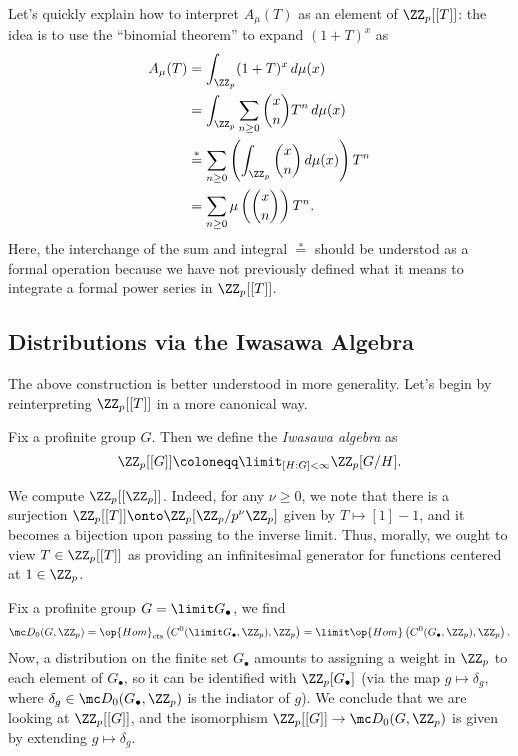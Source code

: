 \documentclass{article}
\begin{document}
Let's quickly explain how to interpret $A_\mu(T)$ as an element of $\ZZ_p[[T]]$: the idea is to use the ``binomial theorem'' to expand $(1+T)^x$ as
\begin{align*}
	A_\mu(T) &= \int_{\ZZ_p}(1+T)^x\,d\mu(x) \\
	&= \int_{\ZZ_p}\sum_{n\ge0}\binom xnT^n\,d\mu(x) \\
	&\stackrel*= \sum_{n\ge0}\left(\int_{\ZZ_p}\binom xn\,d\mu(x)\right)T^n \\
	&= \sum_{n\ge0}\mu\left(\binom xn\right)T^n.
\end{align*}
Here, the interchange of the sum and integral $\stackrel*=$ should be understod as a formal operation because we have not previously defined what it means to integrate a formal power series in $\ZZ_p[[T]]$.

\subsection{Distributions via the Iwasawa Algebra}
The above construction is better understood in more generality. Let's begin by reinterpreting $\ZZ_p[[T]]$ in a more canonical way.
\begin{definition}
	Fix a profinite group $G$. Then we define the \textit{Iwasawa algebra} as
	\[\ZZ_p[[G]]\coloneqq\limit_{[H:G]<\infty}\ZZ_p[G/H].\]
\end{definition}
\begin{example}
	We compute $\ZZ_p[[\ZZ_p]]$. Indeed, for any $\nu\ge0$, we note that there is a surjection $\ZZ_p[[T]]\onto\ZZ_p[\ZZ_p/p^\nu\ZZ_p]$ given by $T\mapsto[1]-1$, and it becomes a bijection upon passing to the inverse limit. Thus, morally, we ought to view $T\in\ZZ_p[[T]]$ as providing an infinitesimal generator for functions centered at $1\in\ZZ_p$.
\end{example}
\begin{example}
	Fix a profinite group $G=\limit G_\bullet$, we find
	\[\mc D_0(G,\ZZ_p)=\op{Hom}_{\mathrm{cts}}\left(C^0(\limit G_\bullet,\ZZ_p),\ZZ_p\right)=\limit\op{Hom}\left(C^0(G_\bullet,\ZZ_p),\ZZ_p\right).\]
	Now, a distribution on the finite set $G_\bullet$ amounts to assigning a weight in $\ZZ_p$ to each element of $G_\bullet$, so it can be identified with $\ZZ_p[G_\bullet]$ (via the map $g\mapsto\delta_g$, where $\delta_g\in\mc D_0(G_\bullet,\ZZ_p)$ is the indiator of $g$). We conclude that we are looking at $\ZZ_p[[G]]$, and the isomorphism $\ZZ_p[[G]]\to\mc D_0(G,\ZZ_p)$ is given by extending $g\mapsto\delta_g$.
\end{example}
\end{document}
